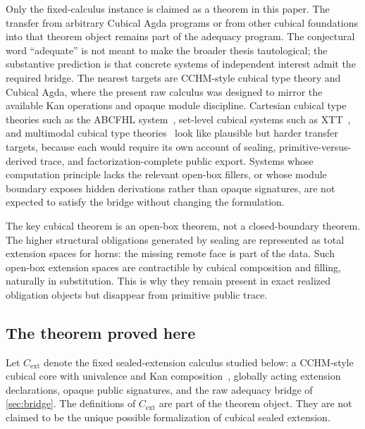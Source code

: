 \documentclass{lmcs}
\newcommand{\Cext}{C_{\mathrm{ext}}}
\begin{document}
Only the fixed-calculus instance is claimed as a theorem in this paper. The transfer from arbitrary Cubical Agda programs or from other cubical foundations into that theorem object remains part of the adequacy program. The conjectural word ``adequate'' is not meant to make the broader thesis tautological; the substantive prediction is that concrete systems of independent interest admit the required bridge. The nearest targets are CCHM-style cubical type theory and Cubical Agda, where the present raw calculus was designed to mirror the available Kan operations and opaque module discipline. Cartesian cubical type theories such as the ABCFHL system~\cite{cartesian-cubical}, set-level cubical systems such as XTT~\cite{xtt}, and multimodal cubical type theories~\cite{aagaard-cubical-mtt} look like plausible but harder transfer targets, because each would require its own account of sealing, primitive-versus-derived trace, and factorization-complete public export. Systems whose computation principle lacks the relevant open-box fillers, or whose module boundary exposes hidden derivations rather than opaque signatures, are not expected to satisfy the bridge without changing the formulation.

The key cubical theorem is an open-box theorem, not a closed-boundary theorem.
The higher structural obligations generated by sealing are represented as total
extension spaces for horns: the missing remote face is part of the data. Such
open-box extension spaces are contractible by cubical composition and filling,
naturally in substitution. This is why they remain present in exact realized
obligation objects but disappear from primitive public trace.

\subsection{The theorem proved here}
\label{subsec:theorem-proved-here}

Let $\Cext$ denote the fixed sealed-extension calculus studied below: a CCHM-style cubical core with univalence and Kan composition~\cite{cubical,cchm-hits}, globally acting extension declarations, opaque public signatures, and the raw adequacy bridge of \autoref{sec:bridge}. The definitions of $\Cext$ are part of the theorem object. They are not claimed to be the unique possible formalization of cubical sealed extension.
\end{document}

